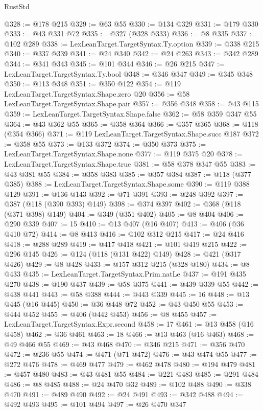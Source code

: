 \begin{lexlean}{RustStd}
\begin{coremodule}
{\begin{coremodule}
{{{{{{{{{{{{{{{{{{{{{{{{{{{{{{{@328 := @178 @215
@329 := @63 @55
@330 := @134 @329
@331 := @179 @330
@333 := @43 @331 @72
@335 := @327 (@328 @333)
@336 := @8 @335
@337 := @102 @289
@338 := LexLeanTarget.TargetSyntax.Ty.option
@339 := @338 @215
@340 := @337 @339
@341 := @24 @340
@342 := @24 @263
@343 := @342 @289
@344 := @341 @343
@345 := @101 @344
@346 := @26 @215
@347 := LexLeanTarget.TargetSyntax.Ty.bool
@348 := @346 @347
@349 := @345 @348
@350 := @113 @348
@351 := @350 @122
@354 := @119 LexLeanTarget.TargetSyntax.Shape.zero @20
@356 := @58 LexLeanTarget.TargetSyntax.Shape.pair
@357 := @356 @348
@358 := @43 @115
@359 := LexLeanTarget.TargetSyntax.Shape.false
@362 := @58 @359 @347 @55
@364 := @43 @362 @55
@365 := @358 @364
@366 := @357 @365
@368 := @118 (@354 @366)
@371 := @119 LexLeanTarget.TargetSyntax.Shape.succ @187
@372 := @358 @55
@373 := @133 @372
@374 := @350 @373
@375 := LexLeanTarget.TargetSyntax.Shape.none
@377 := @119 @375 @20
@378 := LexLeanTarget.TargetSyntax.Shape.true
@381 := @58 @378 @347 @55
@383 := @43 @381 @55
@384 := @358 @383
@385 := @357 @384
@387 := @118 (@377 @385)
@388 := LexLeanTarget.TargetSyntax.Shape.some
@390 := @119 @388 @129
@391 := @136 @143
@392 := @71 @391
@393 := @248 @392
@397 := @387 (@118 (@390 @393) @149)
@398 := @374 @397
@402 := @368 (@118 (@371 @398) @149)
@404 := @349 (@351 @402)
@405 := @8 @404
@406 := @290 @339
@407 := 15
@410 := @13 @407 (@16 @407)
@413 := @406 (@36 @410 @72)
@414 := @8 @413
@416 := @102 @312 @215
@417 := @24 @416
@418 := @288 @289
@419 := @417 @418
@421 := @101 @419 @215
@422 := @296 @145
@426 := @124 (@118 (@131 @422) @149)
@428 := @421 (@317 @426)
@429 := @8 @428
@433 := @157 @312 @215 (@328 @180)
@434 := @8 @433
@435 := LexLeanTarget.TargetSyntax.Prim.natLe
@437 := @191 @435 @270
@438 := @190 @437
@439 := @58 @375
@441 := @439 @339 @55
@442 := @438 @441
@443 := @58 @388
@444 := @443 @339
@445 := 16
@448 := @13 @445 (@16 @445)
@450 := @36 @448 @72
@452 := @43 @450 @55
@453 := @444 @452
@455 := @406 (@442 @453)
@456 := @8 @455
@457 := LexLeanTarget.TargetSyntax.Expr.second
@458 := 17
@461 := @13 @458 (@16 @458)
@462 := @36 @461
@463 := 18
@466 := @13 @463 (@16 @463)
@468 := @49 @466 @55
@469 := @43 @468
@470 := @346 @215
@471 := @356 @470
@472 := @236 @55
@474 := @471 (@71 @472)
@476 := @43 @474 @55
@477 := @272 @476
@478 := @469 @477
@479 := @462 @478
@480 := @194 @479
@481 := @457 @480
@483 := @43 @481 @55
@484 := @221 @483
@485 := @291 @484
@486 := @8 @485
@488 := @24 @470 @32
@489 := @102 @488
@490 := @338 @470
@491 := @489 @490
@492 := @24 @491
@493 := @342 @488
@494 := @492 @493
@495 := @101 @494
@497 := @26 @470 @347
}}}}}}}}}}}}}}}}}}}}}}}}}}}}}}}
\end{coremodule}}
\end{coremodule}
\end{lexlean}
